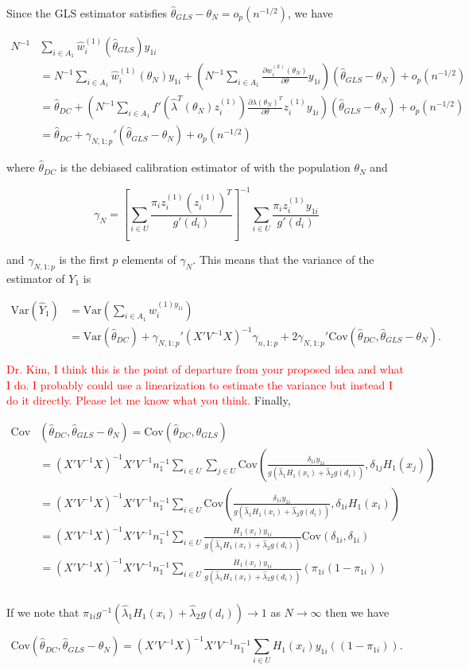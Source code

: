 \documentclass[12pt]{article}
\newcommand{\Cov}{{\text{Cov}}}
\newcommand{\Var}{{\text{Var}}}
\begin{document}
Since the GLS estimator satisfies $\hat \theta_{GLS} - \theta_N = o_p(n^{-1/2})$,
we have

\begin{align*}
  N^{-1} &\sum_{i \in A_1}\hat w_i^{(1)}(\hat \theta_{GLS})y_{1i}\\
  &= N^{-1} \sum_{i \in A_1} \hat w_i^{(1)}(\theta_N)y_{1i} + 
  \left(N^{-1} \sum_{i \in A_1} \frac{\partial w_i^{(k)}(\theta_N)}{\partial
  \theta} y_{1i}\right) (\hat \theta_{GLS} - \theta_N) + o_p(n^{-1/2})\\
  &= \hat \theta_{DC} + \left(N^{-1} \sum_{i \in A_1} 
    f'(\hat \lambda^T(\theta_N) z_i^{(1)}) 
    \frac{\partial \lambda(\theta_N)^T}{\partial \theta} z_i^{(1)} y_{1i} \right)
    (\hat \theta_{GLS} - \theta_N) + o_p(n^{-1/2})\\
  &= \hat \theta_{DC} + \gamma_{N, 1:p}' (\hat \theta_{GLS} - \theta_N) + o_p(n^{-1/2})
\end{align*}

where $\hat \theta_{DC}$ is the debiased calibration estimator of
\cite{kwon2024debiased} with the population $\theta_N$ and 

\[\gamma_N = \left[\sum_{i \in U} \frac{\pi_i z_i^{(1)}(z_i^{(1)})^T}{g'(d_i)}
  \right]^{-1} \sum_{i \in U} \frac{\pi_i z_i^{(1)}y_{1i}}{g'(d_i)}\]

and $\gamma_{N, 1:p}$ is the first $p$ elements of $\gamma_N$. This means that
the variance of the estimator of $Y_1$ is 

\begin{align*}
  \Var(\hat Y_1) &= \Var\left(\sum_{i \in A_1}w_i^{(1)y_{1i}}\right) \\
  &= 
  \Var(\hat \theta_{DC}) + \gamma_{N, 1:p}' (X'V^{-1}X)^{-1} \gamma_{n,1:p} +
  2 \gamma_{N, 1:p}'\Cov(\hat \theta_{DC}, \hat \theta_{GLS} - \theta_{N}).
\end{align*}

\textcolor{red}{Dr. Kim, I think this is the point of departure from your proposed
idea and what I do. I probably could use a linearization to estimate the
variance but instead I do it directly. Please let me know what you think.}
Finally,

\begin{align*}
  \Cov&(\hat \theta_{DC}, \hat \theta_{GLS} - \theta_N)
  = \Cov(\hat \theta_{DC}, \hat \theta_{GLS}) \\
  &= (X'V^{-1}X)^{-1}X'V^{-1}n_1^{-1} \sum_{i \in U} \sum_{j \in U} 
  \Cov\left(\frac{\delta_{1i} y_{1i}}{g(\hat \lambda_1 H_1(x_i) + \hat \lambda_2
    g(d_i))}, \delta_{1j}H_1(x_j)\right)\\
  &= (X'V^{-1}X)^{-1}X'V^{-1}n_1^{-1} \sum_{i \in U} 
  \Cov\left(\frac{\delta_{1i} y_{1i}}{g(\hat \lambda_1 H_1(x_i) + \hat \lambda_2
    g(d_i))}, \delta_{1i}H_1(x_i)\right)\\
  &= (X'V^{-1}X)^{-1}X'V^{-1}n_1^{-1} \sum_{i \in U} 
  \frac{H_1(x_i) y_{1i}}{g(\hat \lambda_1 H_1(x_i) + \hat \lambda_2 g(d_i))}
  \Cov\left(\delta_{1i}, \delta_{1i}\right)\\
  &= (X'V^{-1}X)^{-1}X'V^{-1}n_1^{-1} \sum_{i \in U} 
  \frac{H_1(x_i) y_{1i}}{g(\hat \lambda_1 H_1(x_i) + \hat \lambda_2 g(d_i))}
  (\pi_{1i}(1 - \pi_{1i})) \\
\end{align*}

If we note that $\pi_{1i} g^{-1}(\hat \lambda_1 H_1(x_i) + \hat \lambda_2 g(d_i))
\to 1$ as $N \to \infty$ then we have

\[\Cov(\hat \theta_{DC}, \hat \theta_{GLS} - \theta_N)
  = (X'V^{-1}X)^{-1}X'V^{-1}n_1^{-1} \sum_{i \in U} 
  H_1(x_i) y_{1i} ((1 - \pi_{1i})).
\]
\end{document}
